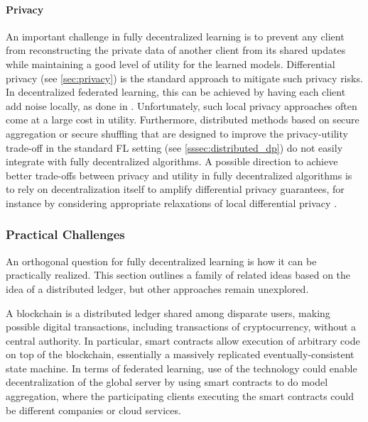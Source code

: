 \documentclass[11pt]{article}
\begin{document}
\paragraph{Privacy}
An important challenge in fully decentralized learning is to prevent any client from reconstructing the private data of another client from its shared updates while maintaining a good level of utility for the learned models. Differential privacy (see \cref{sec:privacy}) is the standard approach to mitigate such privacy risks. In decentralized federated learning, this can be achieved by having each client add noise locally, as done in \citep{Huang2015a,Bellet2018a}. Unfortunately, such local privacy approaches often come at a large cost in utility. Furthermore, distributed methods based on secure aggregation or secure shuffling that are designed to improve the privacy-utility trade-off in the standard FL setting (see \cref{sssec:distributed_dp}) do not easily integrate with fully decentralized algorithms. A possible direction to achieve better trade-offs between privacy and utility in fully decentralized algorithms is to rely on decentralization itself to amplify differential privacy guarantees, for instance by considering appropriate relaxations of local differential privacy \cite{privacy_amp_by_decentralization}.


\subsubsection{Practical Challenges}
\label{sec:p2p-practical}

An orthogonal question for fully decentralized learning is how it can be practically realized. This section outlines a family of related ideas based on the idea of a distributed ledger, but other approaches remain unexplored.

A blockchain is a distributed ledger shared among disparate users, making possible digital transactions, including transactions of cryptocurrency, without a central authority. In particular, smart contracts allow execution of arbitrary code on top of the blockchain, essentially a massively replicated eventually-consistent state machine. In terms of federated learning, use of the technology could enable decentralization of the global server by using smart contracts to do model aggregation, where the participating clients executing the smart contracts could be different companies or cloud services.
\end{document}
